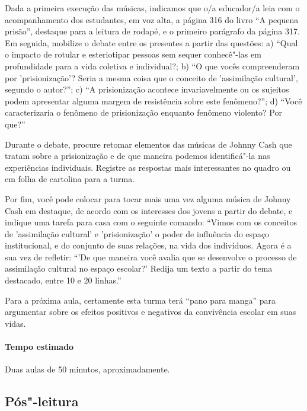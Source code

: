 \documentclass[11pt]{extarticle}
\begin{document}
Dada a primeira execução das músicas, indicamos que o/a educador/a leia
com o acompanhamento dos estudantes, em voz alta, a página 316 do livro
``A pequena prisão'', destaque para a leitura de rodapé, e o primeiro
parágrafo da página 317. Em seguida, mobilize o debate entre os
presentes a partir das questões: a) ``Qual o impacto de rotular e
esteriotipar pessoas sem sequer conhecê"-las em profundidade para a vida
coletiva e individual?; b) ``O que vocês compreenderam por
'prisionização'? Seria a mesma coisa que o conceito de 'assimilação
cultural', segundo o autor?''; c) ``A prisionização acontece invariavelmente ou
os sujeitos podem apresentar alguma margem de resistência sobre este
fenômeno?''; d) ``Você caracterizaria o fenômeno de prisionização enquanto
fenômeno violento? Por que?''

Durante o debate, procure retomar elementos das músicas de Johnny Cash
que tratam sobre a prisionização e de que maneira podemos identificá"-la
nas experiências individuais. Registre as respostas mais interessantes
no quadro ou em folha de cartolina para a turma.

Por fim, você pode colocar para tocar mais uma vez alguma música de
Johnny Cash em destaque, de acordo com os interesses dos jovens a partir
do debate, e indique uma tarefa para casa com o seguinte comando:
``Vimos com os conceitos de 'assimilação cultural' e 'prisionização' o
poder de influência do espaço institucional, e do conjunto de suas
relações, na vida dos indivíduos. Agora é a sua vez de refletir: ``'De que
maneira você avalia que se desenvolve o processo de assimilação cultural
no espaço escolar?' Redija um texto a partir do tema destacado, entre 10
e 20 linhas.''

Para a próxima aula, certamente esta turma terá ``pano para manga'' para
argumentar sobre os efeitos positivos e negativos da convivência escolar
em suas vidas.

\paragraph{Tempo estimado} Duas aulas de 50 minutos, aproximadamente.


\subsection{Pós"-leitura}
\end{document}
